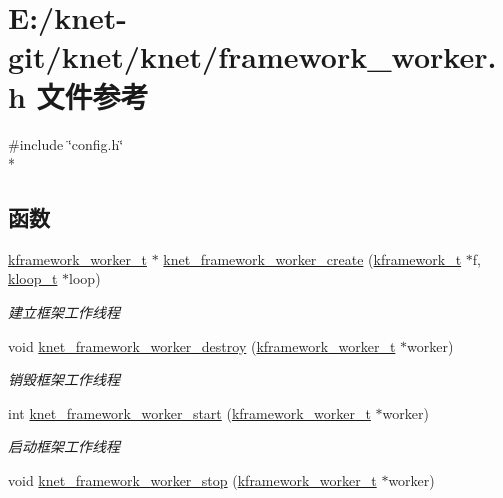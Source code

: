 \hypertarget{a00063}{}\section{E\+:/knet-\/git/knet/knet/framework\+\_\+worker.h 文件参考}
\label{a00063}
{\ttfamily \#include \char`\"{}config.\+h\char`\"{}}\\*
\subsection*{函数}
\begin{DoxyCompactItemize}
\item 
\hyperlink{a00053_af2a7f5b8406de73682f8bd4c2afee783_af2a7f5b8406de73682f8bd4c2afee783}{kframework\+\_\+worker\+\_\+t} $\ast$ \hyperlink{a00063_a032b3c34db5de1a62a8bcf5ca9ebe1f8_a032b3c34db5de1a62a8bcf5ca9ebe1f8}{knet\+\_\+framework\+\_\+worker\+\_\+create} (\hyperlink{a00053_a3195a3be35782fc1efb920c811be111d_a3195a3be35782fc1efb920c811be111d}{kframework\+\_\+t} $\ast$f, \hyperlink{a00053_a97fc76209a58362019f1ded9169e397f_a97fc76209a58362019f1ded9169e397f}{kloop\+\_\+t} $\ast$loop)
\begin{DoxyCompactList}\small\item\em 建立框架工作线程 \end{DoxyCompactList}\item 
void \hyperlink{a00063_a062cc63d020aca69e4434f95ffe8403c_a062cc63d020aca69e4434f95ffe8403c}{knet\+\_\+framework\+\_\+worker\+\_\+destroy} (\hyperlink{a00053_af2a7f5b8406de73682f8bd4c2afee783_af2a7f5b8406de73682f8bd4c2afee783}{kframework\+\_\+worker\+\_\+t} $\ast$worker)
\begin{DoxyCompactList}\small\item\em 销毁框架工作线程 \end{DoxyCompactList}\item 
int \hyperlink{a00063_aeb6f9a3c96da0c33695534a460e8f756_aeb6f9a3c96da0c33695534a460e8f756}{knet\+\_\+framework\+\_\+worker\+\_\+start} (\hyperlink{a00053_af2a7f5b8406de73682f8bd4c2afee783_af2a7f5b8406de73682f8bd4c2afee783}{kframework\+\_\+worker\+\_\+t} $\ast$worker)
\begin{DoxyCompactList}\small\item\em 启动框架工作线程 \end{DoxyCompactList}\item 
void \hyperlink{a00063_a6465eaddfbf6bfa8c7d54b489eb43462_a6465eaddfbf6bfa8c7d54b489eb43462}{knet\+\_\+framework\+\_\+worker\+\_\+stop} (\hyperlink{a00053_af2a7f5b8406de73682f8bd4c2afee783_af2a7f5b8406de73682f8bd4c2afee783}{kframework\+\_\+worker\+\_\+t} $\ast$worker)

\end{DoxyCompactItemize}
